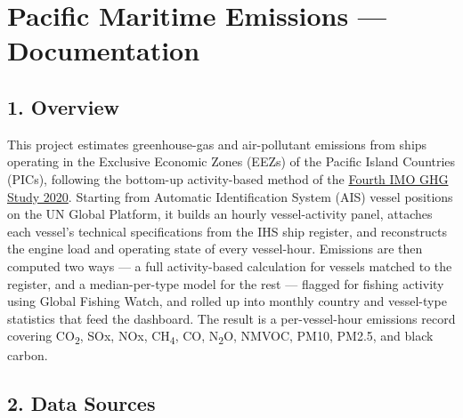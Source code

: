 \documentclass[
  11pt,
]{article}
\author{}
\date{}
\begin{document}
\section{Pacific Maritime Emissions ---
Documentation}\label{pacific-maritime-emissions-documentation}

\subsection{1. Overview}\label{overview}

This project estimates greenhouse-gas and air-pollutant emissions from
ships operating in the Exclusive Economic Zones (EEZs) of the Pacific
Island Countries (PICs), following the bottom-up activity-based method of
the \href{https://www.imo.org/en/ourwork/Environment/Pages/Fourth-IMO-Greenhouse-Gas-Study-2020.aspx}{Fourth
IMO GHG Study 2020}. Starting from Automatic Identification System (AIS)
vessel positions on the UN Global Platform, it builds an hourly
vessel-activity panel, attaches each vessel's technical specifications
from the IHS ship register, and reconstructs the engine load and
operating state of every vessel-hour. Emissions are then computed two
ways --- a full activity-based calculation for vessels matched to the
register, and a median-per-type model for the rest --- flagged for
fishing activity using Global Fishing Watch, and rolled up into monthly
country and vessel-type statistics that feed the dashboard. The result is
a per-vessel-hour emissions record covering CO\textsubscript{2}, SOx,
NOx, CH\textsubscript{4}, CO, N\textsubscript{2}O, NMVOC, PM10, PM2.5,
and black carbon.

\subsection{2. Data Sources}\label{data-sources}
\end{document}
